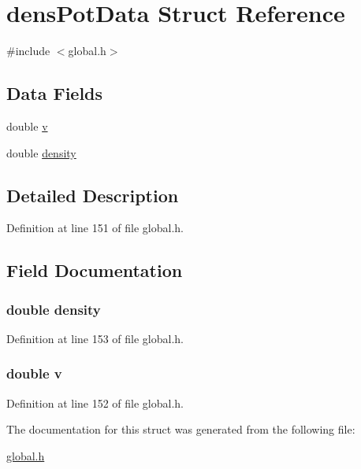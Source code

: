 \hypertarget{structdensPotData}{\section{dens\-Pot\-Data Struct Reference}
\label{structdensPotData}
}


{\ttfamily \#include $<$global.\-h$>$}

\subsection*{Data Fields}
\begin{DoxyCompactItemize}
\item 
double \hyperlink{structdensPotData_a3b90d5a73541ab9402511d87bed076ef}{v}
\item 
double \hyperlink{structdensPotData_a6f8c052f8417728038991f7f2826d38d}{density}
\end{DoxyCompactItemize}


\subsection{Detailed Description}


Definition at line 151 of file global.\-h.



\subsection{Field Documentation}
\hypertarget{structdensPotData_a6f8c052f8417728038991f7f2826d38d}{
\subsubsection[{density}]{\setlength{\rightskip}{0pt plus 5cm}double density}}\label{structdensPotData_a6f8c052f8417728038991f7f2826d38d}


Definition at line 153 of file global.\-h.

\hypertarget{structdensPotData_a3b90d5a73541ab9402511d87bed076ef}{
\subsubsection[{v}]{\setlength{\rightskip}{0pt plus 5cm}double v}}\label{structdensPotData_a3b90d5a73541ab9402511d87bed076ef}


Definition at line 152 of file global.\-h.



The documentation for this struct was generated from the following file\-:\begin{DoxyCompactItemize}
\item 
\hyperlink{global_8h}{global.\-h}\end{DoxyCompactItemize}
